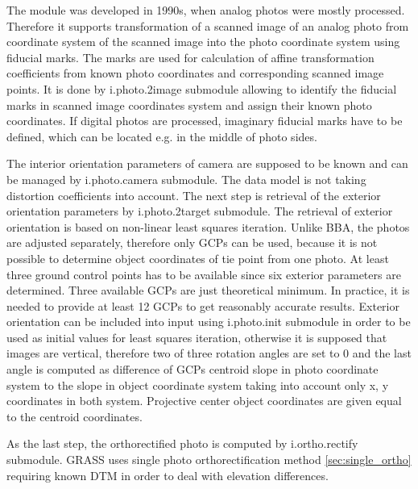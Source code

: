 \documentclass[a4paper,12pt]{article}
\begin{document}
The module was developed in 1990s,  
when analog photos were mostly processed. Therefore it supports 
 transformation of a scanned image of an analog photo from coordinate system of the scanned image into 
 the photo coordinate system using fiducial marks. The marks are used for calculation of 
 affine transformation coefficients from known photo coordinates 
 and corresponding scanned image points.
 It is done by i.photo.2image submodule allowing to identify the fiducial 
 marks in scanned image coordinates system and assign their known photo coordinates.
  If digital photos are processed, imaginary fiducial marks have to be defined, which
can be located e.g. in the middle of photo sides.  
  
The interior orientation parameters of camera are supposed to be known and can 
be managed by i.photo.camera submodule.
The data model is not taking distortion 
coefficients into account. 
The next step is retrieval of the exterior orientation parameters by i.photo.2target submodule.  
The retrieval 
of exterior orientation is based on non-linear least squares iteration. Unlike BBA,
the photos are adjusted separately, therefore only GCPs can be used,
because it is not possible to determine object coordinates of tie point from one photo.
At least three ground control points has to be available since six exterior parameters are 
determined. Three available GCPs are just theoretical minimum. In practice, it is needed to provide at least 12 GCPs
to get reasonably accurate results. Exterior orientation 
can be included into input using i.photo.init submodule in order to be used as initial values for least squares iteration,
otherwise it is supposed that images are vertical, therefore two of three rotation
angles are set to 0 and the last angle is computed as difference of GCPs centroid  slope
in photo coordinate system to the slope in object coordinate system taking into account only x, y coordinates in both system.
Projective center object coordinates are given equal to the centroid coordinates.

As the last step, the orthorectified photo is computed by i.ortho.rectify submodule. GRASS uses single photo orthorectification
method \ref{sec:single_ortho} requiring known DTM in order to deal with elevation differences. 
\end{document}
